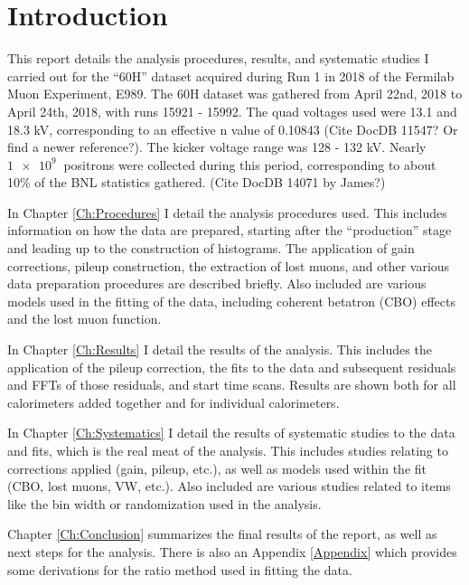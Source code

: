\chapter{Introduction}
\label{Ch:Introduction}

This report details the analysis procedures, results, and systematic studies I carried out for the ``60H'' dataset acquired during Run 1 in 2018 of the Fermilab Muon \gmtwo Experiment, E989. The 60H dataset was gathered from April 22nd, 2018 to April 24th, 2018, with runs 15921 - 15992. The quad voltages used were 13.1 and 18.3 kV, corresponding to an effective n value of 0.10843 (Cite DocDB 11547? Or find a newer reference?). The kicker voltage range was 128 - 132 kV. Nearly $\SI{1e9}{}$ positrons were collected during this period, corresponding to about 10\% of the BNL statistics gathered. (Cite DocDB 14071 by James?)

In Chapter \ref{Ch:Procedures} I detail the analysis procedures used. This includes information on how the data are prepared, starting after the ``production'' stage and leading up to the construction of histograms. The application of gain corrections, pileup construction, the extraction of lost muons, and other various data preparation procedures are described briefly. Also included are various models used in the fitting of the data, including coherent betatron (CBO) effects and the lost muon function.

In Chapter \ref{Ch:Results} I detail the results of the analysis. This includes the application of the pileup correction, the fits to the data and subsequent residuals and FFTs of those residuals, and start time scans. Results are shown both for all calorimeters added together and for individual calorimeters.

In Chapter \ref{Ch:Systematics} I detail the results of systematic studies to the data and fits, which is the real meat of the analysis. This includes studies relating to corrections applied (gain, pileup, etc.), as well as models used within the fit (CBO, lost muons, VW, etc.). Also included are various studies related to items like the bin width or randomization used in the analysis.

Chapter \ref{Ch:Conclusion} summarizes the final results of the report, as well as next steps for the analysis. There is also an Appendix \ref{Appendix} which provides some derivations for the ratio method used in fitting the data.
